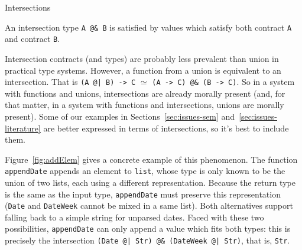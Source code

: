 \documentclass[sigplan,10pt]{acmart}
\newcommand{\resolved}[2]{}
\newcommand{\nickel}[1]{\lstinline[language=nickel]{#1}}
\begin{document}
\resolved{Arnaud: this paragraph is pretty good, on the other hand, there
is no value which lets me complete the example, so this example falls
a bit flat.
Teo: Improved the example, also added another one commented that is, for me,
more realistic, but I think the one uncommented is simpler.}



\subsection{Intersections}

An intersection type \nickel{A @& B} is satisfied by values which
satisfy both contract \nickel{A} and contract \nickel{B}.

Intersection contracts (and types) are probably less prevalent than union in
practical type systems. However, a function from a union is equivalent to an
intersection. That is \nickel{(A @| B) -> C} $\simeq$ \nickel{(A -> C) @& (B ->
C)}. So in a system with functions and unions, intersections are already morally
present (and, for that matter, in a system with functions and intersections,
unions are morally present). Some of our examples in
Sections~\ref{sec:issues-sem} and~\ref{sec:issues-literature} are better
expressed in terms of intersections, so it's best to include them.

Figure~\ref{fig:addElem} gives a concrete example of this phenomenon. The
function \nickel{appendDate} appends an element to \nickel{list}, whose type is
only known to be the union of two lists, each using a different representation.
Because the return type is the same as the input type, \nickel{appendDate} must
preserve this representation (\nickel{Date} and \nickel{DateWeek}
cannot be mixed in a same list).  Both alternatives support falling back to
a simple string for unparsed dates.  Faced with these two possibilities,
\nickel{appendDate} can only append a value which fits both types: this is
precisely the intersection \nickel{(Date @| Str) @& (DateWeek @| Str)}, that
is, \nickel{Str}.
\end{document}
